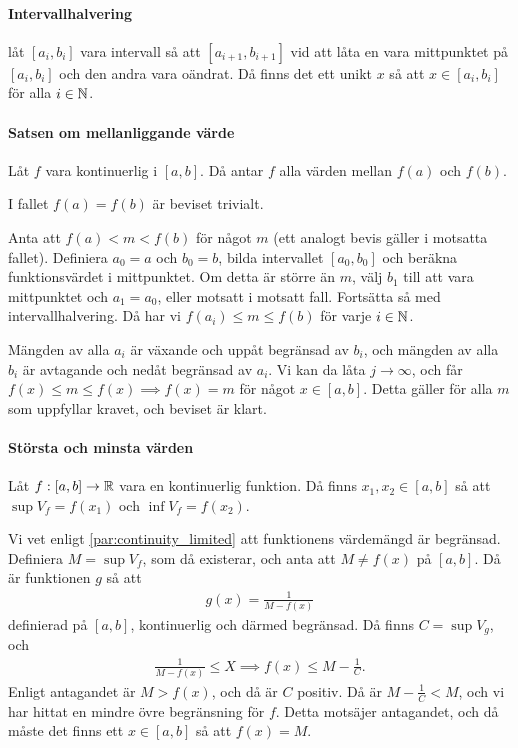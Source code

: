 \proof

\paragraph{Intervallhalvering}
låt $[a_i, b_i]$ vara intervall så att $[a_{i + 1}, b_{i + 1}]$ vid att låta en vara mittpunktet på $[a_i, b_i]$ och den andra vara oändrat. Då finns det ett unikt $x$ så att $x\in [a_i, b_i]$ för alla $i\in\mathbb{N}$.

\proof

\paragraph{Satsen om mellanliggande värde}
Låt $f$ vara kontinuerlig i $[a, b]$. Då antar $f$ alla värden mellan $f(a)$ och $f(b)$.

\proof
I fallet $f(a) = f(b)$ är beviset trivialt.

Anta att $f(a) < m < f(b)$ för något $m$ (ett analogt bevis gäller i motsatta fallet). Definiera $a_0 = a$ och $b_0 = b$, bilda intervallet $[a_0, b_0]$ och beräkna funktionsvärdet i mittpunktet. Om detta är större än $m$, välj $b_1$ till att vara mittpunktet och $a_1 = a_0$, eller motsatt i motsatt fall. Fortsätta så med intervallhalvering. Då har vi $f(a_i)\leq m\leq f(b)$ för varje $i\in\mathbb{N}$.

Mängden av alla $a_i$ är växande och uppåt begränsad av $b_i$, och mängden av alla $b_i$ är avtagande och nedåt begränsad av $a_i$. Vi kan da låta $j\to\infty$, och får $f(x)\leq m\leq f(x)\implies f(x) = m$ för något $x\in [a, b]$. Detta gäller för alla $m$ som uppfyllar kravet, och beviset är klart.

\paragraph{Största och minsta värden}
Låt $f: [a,b]\to\mathbb{R}$ vara en kontinuerlig funktion. Då finns $x_1, x_2\in [a,b]$ så att $\sup{V_f} = f(x_1)$ och $\inf{V_f} = f(x_2)$.

\proof
Vi vet enligt \ref{par:continuity_limited} att funktionens värdemängd är begränsad. Definiera $M = \sup V_f$, som då existerar, och anta att $M\neq f(x)$ på $[a, b]$. Då är funktionen $g$ så att
\begin{align*}
	g(x) = \frac{1}{M - f(x)}
\end{align*}
definierad på $[a, b]$, kontinuerlig och därmed begränsad. Då finns $C = \sup V_g$, och
\begin{align*}
	\frac{1}{M - f(x)}\leq X\implies f(x)\leq M - \frac{1}{C}.
\end{align*}
Enligt antagandet är $M > f(x)$, och då är $C$ positiv. Då är $M - \frac{1}{C} < M$, och vi har hittat en mindre övre begränsning för $f$. Detta motsäjer antagandet, och då måste det finns ett $x\in [a, b]$ så att $f(x) = M$.

